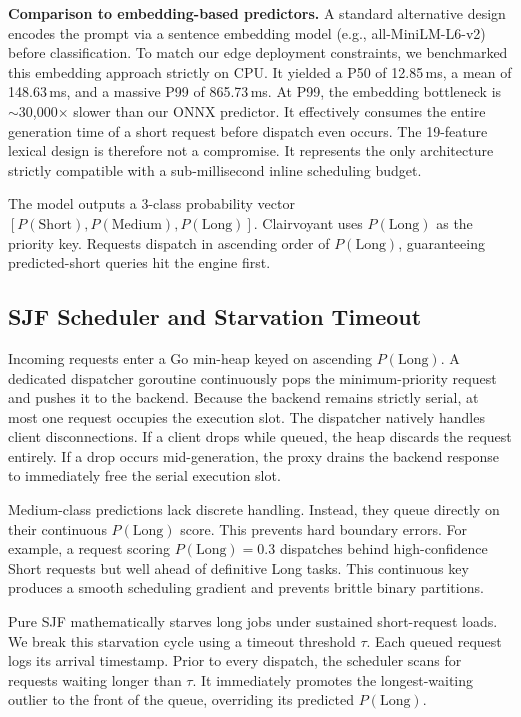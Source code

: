 \documentclass[10pt]{article}
\begin{document}
\textbf{Comparison to embedding-based predictors.} A standard alternative design encodes the prompt via a sentence embedding model (e.g., all-MiniLM-L6-v2) before classification. To match our edge deployment constraints, we benchmarked this embedding approach strictly on CPU. It yielded a P50 of 12.85\,ms, a mean of 148.63\,ms, and a massive P99 of 865.73\,ms. At P99, the embedding bottleneck is $\sim$30,000$\times$ slower than our ONNX predictor. It effectively consumes the entire generation time of a short request before dispatch even occurs. The 19-feature lexical design is therefore not a compromise. It represents the only architecture strictly compatible with a sub-millisecond inline scheduling budget.

The model outputs a 3-class probability vector $[P(\text{Short}), P(\text{Medium}), P(\text{Long})]$. Clairvoyant uses $P(\text{Long})$ as the priority key. Requests dispatch in ascending order of $P(\text{Long})$, guaranteeing predicted-short queries hit the engine first.

\subsection{SJF Scheduler and Starvation Timeout}
\label{sec:scheduler}

Incoming requests enter a Go min-heap keyed on ascending $P(\text{Long})$. A dedicated dispatcher goroutine continuously pops the minimum-priority request and pushes it to the backend. Because the backend remains strictly serial, at most one request occupies the execution slot. The dispatcher natively handles client disconnections. If a client drops while queued, the heap discards the request entirely. If a drop occurs mid-generation, the proxy drains the backend response to immediately free the serial execution slot.

Medium-class predictions lack discrete handling. Instead, they queue directly on their continuous $P(\text{Long})$ score. This prevents hard boundary errors. For example, a request scoring $P(\text{Long}) = 0.3$ dispatches behind high-confidence Short requests but well ahead of definitive Long tasks. This continuous key produces a smooth scheduling gradient and prevents brittle binary partitions.

Pure SJF mathematically starves long jobs under sustained short-request loads. We break this starvation cycle using a timeout threshold $\tau$. Each queued request logs its arrival timestamp. Prior to every dispatch, the scheduler scans for requests waiting longer than $\tau$. It immediately promotes the longest-waiting outlier to the front of the queue, overriding its predicted $P(\text{Long})$.
\end{document}
